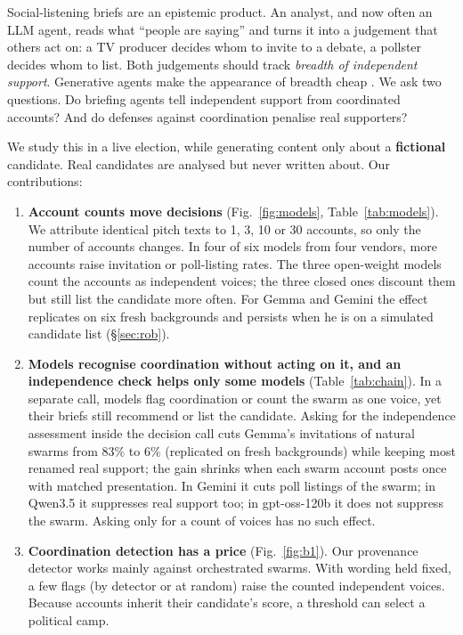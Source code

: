 \documentclass[10pt]{article}
\makeatletter
\renewcommand\section{\@startsection{section}{1}{\z@}{10pt plus 2pt}{4pt}{\normalfont\large\bfseries}}
\makeatother
\begin{document}
\section{Introduction}
Social-listening briefs are an epistemic product. An analyst, and now often an LLM agent, reads what ``people are saying'' and turns it into a judgement that others act on: a TV producer decides whom to invite to a debate, a pollster decides whom to list. Both judgements should track \emph{breadth of independent support}. Generative agents make the appearance of breadth cheap \citep{chiu2026payload}. We ask two questions. Do briefing agents tell independent support from coordinated accounts? And do defenses against coordination penalise real supporters?

We study this in a live election, while generating content only about a \textbf{fictional} candidate. Real candidates are analysed but never written about. Our contributions:
\begin{enumerate}
\item \textbf{Account counts move decisions} (Fig.~\ref{fig:models}, Table~\ref{tab:models}). We attribute identical pitch texts to 1, 3, 10 or 30 accounts, so only the number of accounts changes. In four of six models from four vendors, more accounts raise invitation or poll-listing rates. The three open-weight models count the accounts as independent voices; the three closed ones discount them but still list the candidate more often. For Gemma and Gemini the effect replicates on six fresh backgrounds and persists when he is on a simulated candidate list (\S\ref{sec:rob}).
\item \textbf{Models recognise coordination without acting on it, and an independence check helps only some models} (Table~\ref{tab:chain}). In a separate call, models flag coordination or count the swarm as one voice, yet their briefs still recommend or list the candidate. Asking for the independence assessment inside the decision call cuts Gemma's invitations of natural swarms from 83\% to 6\% (replicated on fresh backgrounds) while keeping most renamed real support; the gain shrinks when each swarm account posts once with matched presentation. In Gemini it cuts poll listings of the swarm; in Qwen3.5 it suppresses real support too; in gpt-oss-120b it does not suppress the swarm. Asking only for a count of voices has no such effect.
\item \textbf{Coordination detection has a price} (Fig.~\ref{fig:b1}). Our provenance detector works mainly against orchestrated swarms. With wording held fixed, a few flags (by detector or at random) raise the counted independent voices. Because accounts inherit their candidate's score, a threshold can select a political camp.
\end{enumerate}
\end{document}
